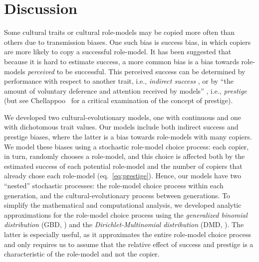\documentclass[12pt]{extarticle}
\begin{document}
\section*{Discussion}
Some cultural traits or cultural role-models may be copied more often than others due to transmission biases. 
One such bias is success bias, in which copiers are more likely to copy a successful role-model. 
It has been suggested that because it is hard to estimate success, a more common bias is a bias towards role-models \emph{perceived} to be successful.
This perceived success can be determined by performance with respect to another trait, i.e., \emph{indirect success} \citep{evolutionBook,fijian_social_bias}, or by ``the amount of voluntary deference and attention received by models'' \citep{prestigeSocialLearn}, i.e., \emph{prestige} \citep{prestige_cultural_learning,prestige_evolution,Nakata2024} (but see Chellappoo~\citep{rethinkPrestige} for a critical examination of the concept of prestige).

We developed two cultural-evolutionary models, one with continuous and one with dichotomous trait values.
Our models include both indirect success and prestige biases, where the latter is a bias towards role-models with many copiers. We model these biases using a stochastic role-model choice process: each copier, in turn, randomly chooses a role-model, and this choice is affected both by the estimated success of each potential role-model and the number of copiers that already chose each role-model (eq.~\ref{eq:prestige}). 
Hence, our models have two ``nested'' stochastic processes: the role-model choice process within each generation, and the cultural-evolutionary process between generations.
To simplify the mathematical and computational analysis, we developed analytic approximations for the role-model choice process using the {\em generalized binomial distribution} (GBD, ) and the {\em Dirichlet-Multinomial distribution} (DMD, ).
The latter is especially useful, as it approximates the entire role-model choice process and only requires us to assume that the relative effect of success and prestige is a characteristic of the role-model and not the copier.
\end{document}
